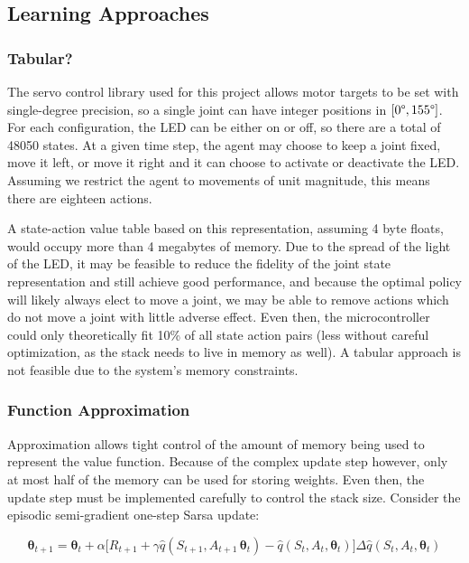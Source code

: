 \documentclass{article}
\begin{document}
	
	\subsection{Learning Approaches}
	
	\subsubsection{Tabular?}
	
	The servo control library used for this project allows motor targets to be set with single-degree precision, so a single joint can have integer positions in  $[0\degree, 155\degree]$. For each configuration, the LED can be either on or off, so there are a total of 48050 states. At a given time step, the agent may choose to keep a joint fixed, move it left, or move it right and it can choose to activate or deactivate the LED. Assuming we restrict the agent to movements of unit magnitude, this means there are eighteen actions.

	A state-action value table based on this representation, assuming 4 byte floats, would occupy more than 4 megabytes of memory. Due to the spread of the light of the LED, it may be feasible to reduce the fidelity of the joint state representation and still achieve good performance, and because the optimal policy will likely always elect to move a joint, we may be able to remove actions which do not move a joint with little adverse effect. Even then, the microcontroller could only theoretically fit 10\% of all state action pairs (less without careful optimization, as the stack needs to live in memory as well). A tabular approach is not feasible due to the system's memory constraints.
	
	\subsubsection{Function Approximation}
	
	Approximation allows tight control of the amount of memory being used to represent the value function. Because of the complex update step however, only at most half of the memory can be used for storing weights. Even then, the update step must be implemented carefully to control the stack size. Consider the episodic semi-gradient one-step Sarsa update:
	
	\begin{equation}\label{eqn:update}
	\bm{\theta}_{t+1} = 
	\bm{\theta}_t + 
	\alpha \Big[
		R_{t+1} + 
		\gamma \hat{q}(S_{t+1}, A_{t+1}\, \bm{\theta}_t) 
		- \hat{q}(S_t, A_t, \bm{\theta}_t)
	\Big]
	\Delta\hat{q}(S_t, A_t, \bm{\theta}_t)\tag{1}
	\end{equation}
	
\end{document}
